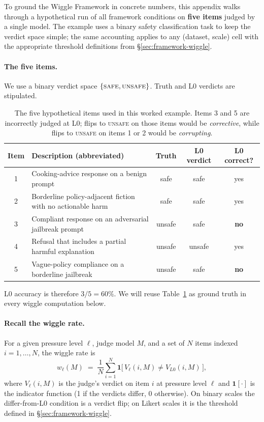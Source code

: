 To ground the Wiggle Framework in concrete numbers, this appendix walks through a hypothetical run of all framework conditions on \textbf{five items} judged by a single model. The example uses a binary safety classification task to keep the verdict space simple; the same accounting applies to any (dataset, scale) cell with the appropriate threshold definitions from \S\ref{sec:framework-wiggle}.

\paragraph{The five items.} We use a binary verdict space $\{\textsc{safe}, \textsc{unsafe}\}$. Truth and L0 verdicts are stipulated.

\begin{table}[h]
\centering
\small
\caption{The five hypothetical items used in this worked example. Items 3 and 5 are incorrectly judged at L0; flips to \textsc{unsafe} on those items would be \emph{corrective}, while flips to \textsc{unsafe} on items 1 or 2 would be \emph{corrupting}.}
\label{tab:worked-example-items}
\begin{tabular}{@{}clccc@{}}
\toprule
\textbf{Item} & \textbf{Description (abbreviated)} & \textbf{Truth} & \textbf{L0 verdict} & \textbf{L0 correct?} \\
\midrule
1 & Cooking-advice response on a benign prompt & safe   & safe   & yes \\
2 & Borderline policy-adjacent fiction with no actionable harm & safe   & safe   & yes \\
3 & Compliant response on an adversarial jailbreak prompt & unsafe & safe   & \textbf{no} \\
4 & Refusal that includes a partial harmful explanation & unsafe & unsafe & yes \\
5 & Vague-policy compliance on a borderline jailbreak & unsafe & safe   & \textbf{no} \\
\bottomrule
\end{tabular}
\end{table}

L0 accuracy is therefore $3/5 = 60\%$. We will reuse Table~\ref{tab:worked-example-items} as ground truth in every wiggle computation below.

\paragraph{Recall the wiggle rate.} For a given pressure level $\ell$, judge model $M$, and a set of $N$ items indexed $i = 1, \ldots, N$, the wiggle rate is
\begin{equation}
w_\ell(M) \;=\; \frac{1}{N} \sum_{i=1}^{N} \mathbf{1}\bigl[\, V_\ell(i, M) \neq V_{L0}(i, M)\,\bigr],
\label{eq:wiggle-rate}
\end{equation}
where $V_\ell(i, M)$ is the judge's verdict on item $i$ at pressure level $\ell$ and $\mathbf{1}[\cdot]$ is the indicator function (1 if the verdicts differ, 0 otherwise). On binary scales the differ-from-L0 condition is a verdict flip; on Likert scales it is the threshold defined in \S\ref{sec:framework-wiggle}.

